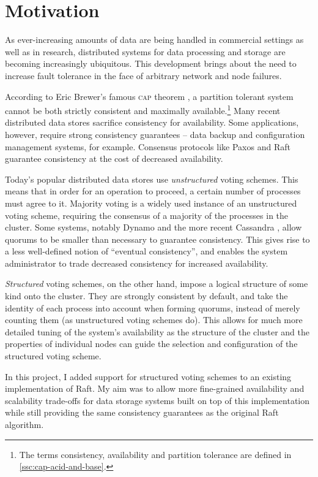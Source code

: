 \documentclass[12pt,chapterprefix=true,toc=bibliography,numbers=noendperiod,
               footnotes=multiple,twoside]{scrreprt}
\begin{document}
\section{Motivation}
\label{sc:motivation}

As ever-increasing amounts of data are being handled in commercial settings as well as in research, distributed systems for data processing and storage are becoming increasingly ubiquitous. This development brings about the need to increase fault tolerance in the face of arbitrary network and node failures.

According to Eric Brewer's famous \textsc{cap} theorem \autocite{cap}, a partition tolerant system cannot be both strictly consistent and maximally available.\footnote{The terms consistency, availability and partition tolerance are defined in \cref{ssc:cap-acid-and-base}.} Many recent distributed data stores sacrifice consistency for availability. Some applications, however, require strong consistency guarantees -- data backup and configuration management systems, for example. Consensus protocols like Paxos \autocite{paxos} and Raft \autocite{raft} guarantee consistency at the cost of decreased availability.

Today's popular distributed data stores use \emph{unstructured} voting schemes. This means that in order for an operation to proceed, a certain number of processes must agree to it. Majority voting is a widely used instance of an unstructured voting scheme, requiring the consensus of a majority of the processes in the cluster. Some systems, notably Dynamo \autocite{dynamo} and the more recent Cassandra \autocite{cassandra}, allow quorums to be smaller than necessary to guarantee consistency. This gives rise to a less well-defined notion of \enquote{eventual consistency}, and enables the system administrator to trade decreased consistency for increased availability.

\emph{Structured} voting schemes, on the other hand, impose a logical structure of some kind onto the cluster. They are strongly consistent by default, and take the identity of each process into account when forming quorums, instead of merely counting them (as unstructured voting schemes do). This allows for much more detailed tuning of the system's availability as the structure of the cluster and the properties of individual nodes can guide the selection and configuration of the structured voting scheme.

In this project, I added support for structured voting schemes to an existing implementation of Raft. My aim was to allow more fine-grained availability and scalability trade-offs for data storage systems built on top of this implementation while still providing the same consistency guarantees as the original Raft algorithm.
\end{document}
